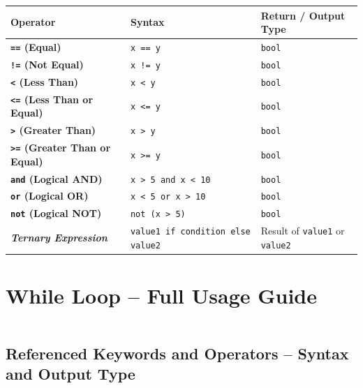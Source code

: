 \documentclass[a4paper,11pt]{article}
\begin{document}
	\begin{tabular}{>{\bfseries}p{4cm} p{7.5cm} p{3cm}}
		\toprule
		Operator & Syntax & Return / Output Type \\
		\midrule
		
		\texttt{==} (Equal) & \texttt{x == y} & \texttt{bool} \\
		
		\texttt{!=} (Not Equal) & \texttt{x != y} & \texttt{bool} \\
		
		\texttt{<} (Less Than) & \texttt{x < y} & \texttt{bool} \\
		
		\texttt{<=} (Less Than or Equal) & \texttt{x <= y} & \texttt{bool} \\
		
		\texttt{>} (Greater Than) & \texttt{x > y} & \texttt{bool} \\
		
		\texttt{>=} (Greater Than or Equal) & \texttt{x >= y} & \texttt{bool} \\
		
		\texttt{and} (Logical AND) & \texttt{x > 5 and x < 10} & \texttt{bool} \\
		
		\texttt{or} (Logical OR) & \texttt{x < 5 or x > 10} & \texttt{bool} \\
		
		\texttt{not} (Logical NOT) & \texttt{not (x > 5)} & \texttt{bool} \\
		
		\textit{Ternary Expression} & \texttt{value1 if condition else value2} & Result of \texttt{value1} or \texttt{value2} \\
		\bottomrule
	\end{tabular}
	
		\newpage
		
	\section{While Loop – Full Usage Guide}
	\inputminted{python}{Python_Files/while_loop_guid.py}
	
	
	\vspace{1em}
	\subsection*{Referenced Keywords and Operators – Syntax and Output Type}
	
\end{document}
